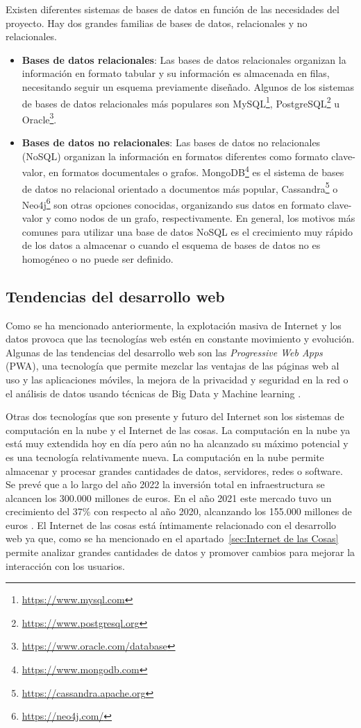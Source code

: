 \documentclass[a4paper, 12pt, oneside]{book}
\begin{document}
Existen diferentes sistemas de bases de datos en función de las necesidades del proyecto. Hay dos grandes familias de bases de datos, relacionales y no relacionales.

\begin{itemize}
\item \textbf{Bases de datos relacionales}: Las bases de datos relacionales organizan la información en formato tabular y su información es almacenada en filas, necesitando seguir un esquema previamente diseñado. Algunos de los sistemas de bases de datos relacionales más populares son MySQL\footnote{\url{https://www.mysql.com}}, PostgreSQL\footnote{\url{https://www.postgresql.org}} u Oracle\footnote{\url{https://www.oracle.com/database}}.

\item \textbf{Bases de datos no relacionales}: Las bases de datos no relacionales (NoSQL) organizan la información en formatos diferentes como formato clave-valor, en formatos documentales o grafos. MongoDB\footnote{\url{https://www.mongodb.com}} es el sistema de bases de datos no relacional orientado a documentos más popular, Cassandra\footnote{\url{https://cassandra.apache.org}} o Neo4j\footnote{\url{https://neo4j.com/}} son otras opciones conocidas, organizando sus datos en formato clave-valor y como nodos de un grafo, respectivamente. En general, los motivos más comunes para utilizar una base de datos NoSQL es el crecimiento muy rápido de los datos a almacenar o cuando el esquema de bases de datos no es homogéneo o no puede ser definido.
\end{itemize}

\subsection{Tendencias del desarrollo web}
\label{subsec: tendencias del desarrollo web}
Como se ha mencionado anteriormente, la explotación masiva de Internet y los datos provoca que las tecnologías web estén en constante movimiento y evolución. Algunas de las tendencias del desarrollo web son las \textit{Progressive Web Apps} (PWA), una tecnología que permite mezclar las ventajas de las páginas web al uso y las aplicaciones móviles, la mejora de la privacidad y seguridad en la red o el análisis de datos usando técnicas de Big Data y Machine learning \cite{pwa}. 

Otras dos tecnologías que son presente y futuro del Internet son los sistemas de computación en la nube y el Internet de las cosas. La computación en la nube ya está muy extendida hoy en día pero aún no ha alcanzado su máximo potencial y es una tecnología relativamente nueva. La computación en la nube permite almacenar y procesar grandes cantidades de datos, servidores, redes o software. Se prevé que a lo largo del año 2022 la inversión total en infraestructura se alcancen los 300.000 millones de euros. En el año 2021 este mercado tuvo un crecimiento del 37\% con respecto al año 2020, alcanzando los 155.000 millones de euros \cite{nube}.
El Internet de las cosas está íntimamente relacionado con el desarrollo web ya que, como se ha mencionado en el apartado~\ref{sec:Internet de las Cosas} permite analizar grandes cantidades de datos y promover cambios para mejorar la interacción con los usuarios.
\end{document}
